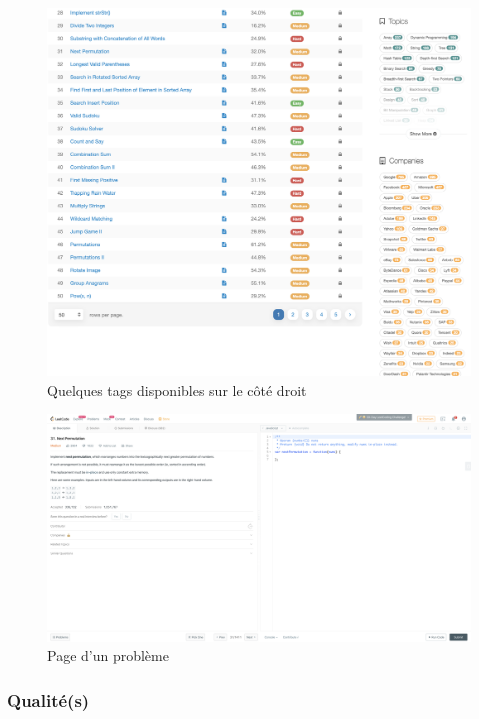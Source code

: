 \begin{figure}[H]
    \includegraphics[width=\textwidth,height=0.35\textheight,keepaspectratio]{images/comparison/leetcode-2.png}
    \centering
    \caption[Leetcode : quelques \glspl{tag} disponibles sur le côté droit]{Quelques \glspl{tag} disponibles sur le côté droit}
\end{figure}

\begin{figure}[H]
    \includegraphics[width=\textwidth,height=0.35\textheight,keepaspectratio]{images/comparison/leetcode-3.png}
    \centering
    \caption[Leetcode : page d'un problème]{Page d'un problème}
\end{figure}

\subsubsection*{Qualité(s)}

